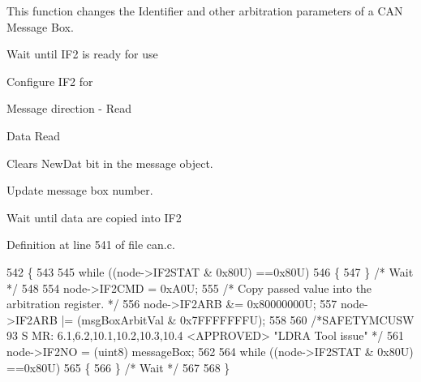 This function changes the Identifier and other arbitration parameters of a C\+AN Message Box. 
\begin{DoxyItemize}
\item Wait until I\+F2 is ready for use ~\newline
~\newline
~\newline

\item Configure I\+F2 for
\begin{DoxyItemize}
\item Message direction -\/ Read
\item Data Read
\item Clears New\+Dat bit in the message object.
\end{DoxyItemize}
\item Update message box number. ~\newline

\item Wait until data are copied into I\+F2 
\end{DoxyItemize}

Definition at line 541 of file can.\+c.


\begin{DoxyCode}
542 \{
543 
545     \textcolor{keywordflow}{while} ((node->IF2STAT & 0x80U) ==0x80U)
546     \{
547     \} \textcolor{comment}{/* Wait */}
548 
554     node->IF2CMD = 0xA0U;
555     \textcolor{comment}{/* Copy passed value into the arbitration register. */}
556     node->IF2ARB &= 0x80000000U;
557     node->IF2ARB |= (msgBoxArbitVal & 0x7FFFFFFFU);
558 
560     \textcolor{comment}{/*SAFETYMCUSW 93 S MR: 6.1,6.2,10.1,10.2,10.3,10.4 <APPROVED> "LDRA Tool issue" */}
561     node->IF2NO = (uint8) messageBox;
562 
564     \textcolor{keywordflow}{while} ((node->IF2STAT & 0x80U) ==0x80U)
565     \{
566     \} \textcolor{comment}{/* Wait */}
567 
568 \}
\end{DoxyCode}
